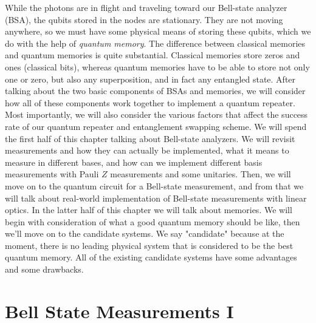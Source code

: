 While the photons are in flight and traveling toward our Bell-state analyzer (BSA), the qubits stored in the nodes are stationary. They are not moving anywhere, so we must have some physical means of storing these qubits, which we do with the help of \emph{quantum memory}. The difference between classical memories and quantum memories is quite substantial. Classical memories store zeros and ones (classical bits), whereas quantum memories have to be able to store not only one or zero, but also any superposition, and in fact any entangled state. 
After talking about the two basic components of BSAs and memories, we will consider how all of these components work together to implement a quantum repeater. Most importantly, we will also consider the various factors that affect the success rate of our quantum repeater and entanglement swapping scheme. We will spend the first half of this chapter talking about Bell-state analyzers. We will revisit measurements and how they can actually be implemented, what it means to measure in different bases, and how can we implement different basis measurements with Pauli $Z$ measurements and some unitaries. Then, we will move on to the quantum circuit for a Bell-state measurement, and from that we will talk about real-world implementation of Bell-state measurements with linear optics.  In the latter half of this chapter we will talk about memories. We will begin with consideration of what a good quantum memory should be like, then we'll move on to the candidate systems.  We say "candidate" because at the moment, there is no leading physical system that is considered to be the best quantum memory. All of the existing candidate systems have some advantages and some drawbacks.



\section{Bell State Measurements I}


